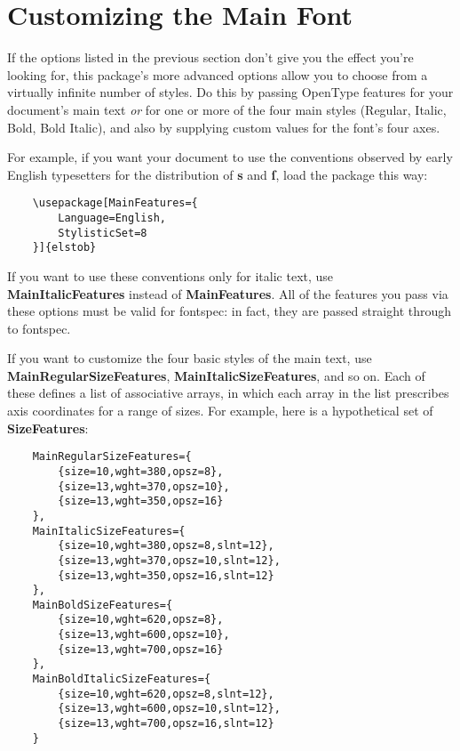 \documentclass[12pt]{article}
\newcommand{\fspec}{{\sffamily fontspec}}
\begin{document}
\section{Customizing the Main Font}

If the options listed in the previous section don't give you the effect you're looking for,
this package's more advanced options allow you to choose
from a virtually infinite number of styles. Do this by passing OpenType features 
for your document's main text \emph{or} for one or more of the four main styles
(Regular, Italic, Bold, Bold Italic), and also by supplying custom values for the
font's four axes.

For example, if you want your document to use the conventions observed by early
English typesetters for the distribution of \textbf{s} and \textbf{ſ}, load the
package this way:

\footnotesize
\begin{verbatim}
    \usepackage[MainFeatures={
        Language=English,
        StylisticSet=8
    }]{elstob}
\end{verbatim}
\normalsize

\noindent If you want to use these conventions only for italic text, use
\textbf{MainItalicFeatures} instead of \textbf{MainFeatures}. All of the
features you pass via these options must be valid for \fspec: in fact,
they are passed straight through to \fspec.

If you want to customize the four basic styles of the main text, use
\textbf{MainRegularSizeFeatures}, \textbf{MainItalicSizeFeatures}, and so on.
Each of these defines a list of associative arrays, in which each array in the
list prescribes axis coordinates for a range of sizes.
For example, here is a hypothetical set of \textbf{SizeFeatures}:

\footnotesize
\begin{verbatim}
    MainRegularSizeFeatures={
        {size=10,wght=380,opsz=8},
        {size=13,wght=370,opsz=10},
        {size=13,wght=350,opsz=16}
    },
    MainItalicSizeFeatures={
        {size=10,wght=380,opsz=8,slnt=12},
        {size=13,wght=370,opsz=10,slnt=12},
        {size=13,wght=350,opsz=16,slnt=12}
    },
    MainBoldSizeFeatures={
        {size=10,wght=620,opsz=8},
        {size=13,wght=600,opsz=10},
        {size=13,wght=700,opsz=16}
    },
    MainBoldItalicSizeFeatures={
        {size=10,wght=620,opsz=8,slnt=12},
        {size=13,wght=600,opsz=10,slnt=12},
        {size=13,wght=700,opsz=16,slnt=12}
    }
\end{verbatim}\normalsize
\end{document}
